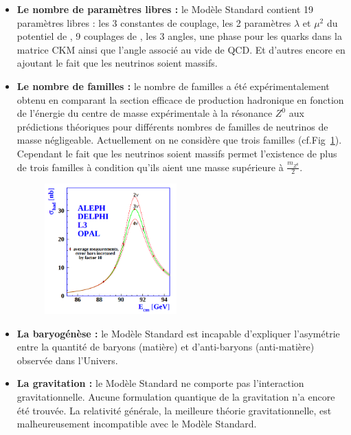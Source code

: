 \begin{itemize}[label=$\bullet$]
\item \textbf{Le nombre de paramètres libres :} le Modèle Standard contient \num{19} paramètres libres : les \num{3} constantes de couplage, les \num{2} paramètres $\lambda$ et $\mu^2$ du potentiel de , \num{9} couplages de , les \num{3} angles, une phase pour les quarks dans la matrice CKM ainsi que l'angle associé au vide de QCD. Et d'autres encore en ajoutant le fait que les neutrinos soient massifs.

\item \textbf{Le nombre de familles :} le nombre de familles a été expérimentalement obtenu en comparant la section efficace de production hadronique en fonction de l'énergie du centre de masse expérimentale à la résonance $Z^{0}$ aux prédictions théoriques pour différents nombres de familles de neutrinos de masse négligeable. Actuellement on ne considère que trois familles (cf.Fig~\ref{neutrinos}). Cependant le fait que les neutrinos soient massifs permet l'existence de plus de trois familles à condition qu'ils aient une masse supérieure à $\frac{m_{Z^{0}}}{2}$.
\begin{figure}[ht!]
\centering
\includegraphics[width=0.48\textwidth]{SM/neutrinos.png}
\label{neutrinos}
\end{figure}

\item \textbf{La baryogénèse :} le Modèle Standard est incapable d'expliquer l'asymétrie entre la quantité de baryons (matière) et d'anti-baryons (anti-matière) observée dans l'Univers.

\item \textbf{La gravitation :} le Modèle Standard ne comporte pas l'interaction gravitationnelle. Aucune formulation quantique de la gravitation n'a encore été trouvée. La relativité générale, la meilleure théorie gravitationnelle, est malheureusement incompatible avec le Modèle Standard.


\end{itemize}
